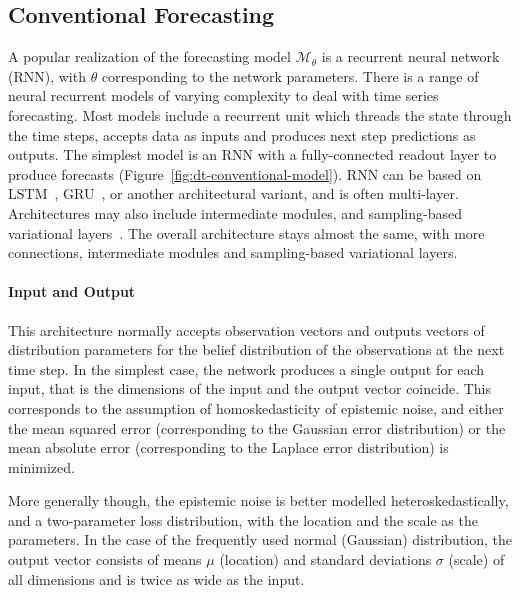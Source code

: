 \documentclass[runningheads]{llncs}
\begin{document}
\subsection{Conventional Forecasting}

A popular realization of the forecasting model
$\mathcal{M}_\theta$ is a recurrent neural network (RNN), with
$\theta$ corresponding to the network parameters.  There is a
range of neural recurrent models of varying complexity to deal
with time series forecasting. Most models include a recurrent
unit which threads the state through the time steps, accepts
data as inputs and produces next step predictions as outputs.
The simplest model is an RNN with a fully-connected readout
layer to produce forecasts
(Figure~\ref{fig:dt-conventional-model}).  RNN can be based on
LSTM~\cite{HS97}, GRU~\cite{CMB+14}, or another architectural variant, and
is often multi-layer.  Architectures  may also include
intermediate modules, and sampling-based variational
layers~\cite{CKD+15,YB21}. The overall architecture stays almost
the same, with more connections, intermediate modules and
sampling-based variational layers.

\paragraph{Input and Output} This architecture normally accepts
observation vectors and outputs vectors of distribution
parameters for the belief distribution of the observations at
the next time step. In the simplest case, the network produces a 
single output for each input, that is the dimensions of the
input and the output vector coincide. This corresponds to the
assumption of homoskedasticity of epistemic noise, and either
the mean squared error (corresponding to the Gaussian error
distribution) or the mean absolute error (corresponding to the
Laplace error distribution) is minimized. 

More generally though, the epistemic noise is better modelled
heteroskedastically, and a two-parameter loss distribution,
with the location and the scale as the parameters.
In the case of the frequently used normal (Gaussian)
distribution, the output vector consists of means $\mu$
(location) and standard deviations $\sigma$ (scale) of all
dimensions and is twice as wide as the input.
\end{document}
